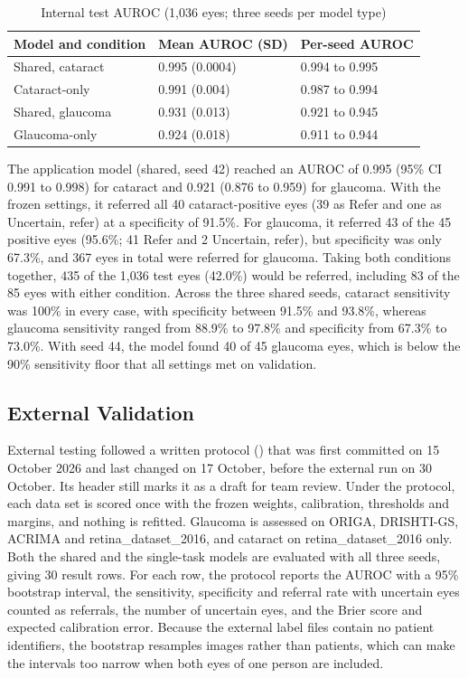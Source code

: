 \documentclass[conference,a4paper]{IEEEtran}
\begin{document}
\begin{table}[t]
\caption{Internal test AUROC (1,036 eyes; three seeds per model type)}
\label{tab:I}\centering\footnotesize
\begin{tabular}{@{}lll@{}}\toprule
Model and condition & Mean AUROC (SD) & Per-seed AUROC \\ \midrule
Shared, cataract & 0.995 (0.0004) & 0.994 to 0.995 \\
Cataract-only & 0.991 (0.004) & 0.987 to 0.994 \\
Shared, glaucoma & 0.931 (0.013) & 0.921 to 0.945 \\
Glaucoma-only & 0.924 (0.018) & 0.911 to 0.944 \\ \bottomrule
\end{tabular}\end{table}

The application model (shared, seed 42) reached an AUROC of 0.995 (95\% CI 0.991 to 0.998) for
cataract and 0.921 (0.876 to 0.959) for glaucoma. With the frozen settings, it referred all 40
cataract-positive eyes (39 as Refer and one as Uncertain, refer) at a specificity of 91.5\%. For
glaucoma, it referred 43 of the 45 positive eyes (95.6\%; 41 Refer and 2 Uncertain, refer), but
specificity was only 67.3\%, and 367 eyes in total were referred for glaucoma. Taking both
conditions together, 435 of the 1,036 test eyes (42.0\%) would be referred, including 83 of the 85
eyes with either condition. Across the three shared seeds, cataract sensitivity was 100\% in every
case, with specificity between 91.5\% and 93.8\%, whereas glaucoma sensitivity ranged from 88.9\% to
97.8\% and specificity from 67.3\% to 73.0\%. With seed 44, the model found 40 of 45 glaucoma eyes,
which is below the 90\% sensitivity floor that all settings met on validation.

\subsection{External Validation}

External testing followed a written protocol
() that was first committed on 15 October
2026 and last changed on 17 October, before the external run on 30 October. Its header still marks
it as a draft for team review. Under the protocol, each data set is scored once with the frozen
weights, calibration, thresholds and margins, and nothing is refitted. Glaucoma is assessed on
ORIGA, DRISHTI-GS, ACRIMA and retina\_dataset\_2016, and cataract on retina\_dataset\_2016 only.
Both the shared and the single-task models are evaluated with all three seeds, giving 30 result
rows. For each row, the protocol reports the AUROC with a 95\% bootstrap interval, the sensitivity,
specificity and referral rate with uncertain eyes counted as referrals, the number of uncertain
eyes, and the Brier score and expected calibration error. Because the external label files contain
no patient identifiers, the bootstrap resamples images rather than patients, which can make the
intervals too narrow when both eyes of one person are included.
\end{document}
